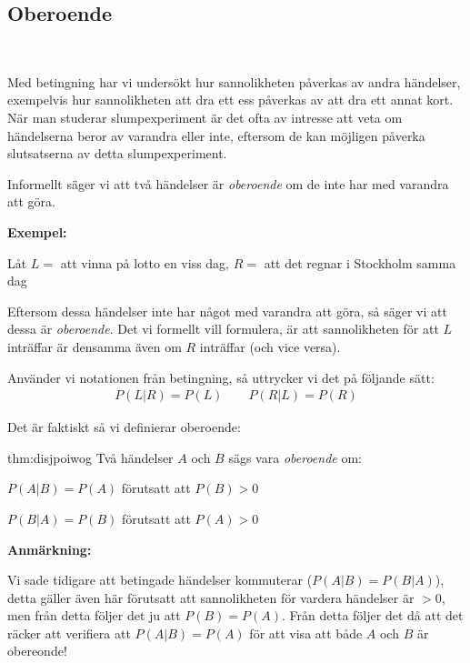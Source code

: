 \subsection{Oberoende}\hfill\\\par
\noindent Med betingning har vi undersökt hur sannolikheten påverkas av andra händelser, exempelvis hur sannolikheten att dra ett ess påverkas av att dra ett annat kort. När man studerar slumpexperiment är det ofta av intresse att veta om händelserna beror av varandra eller inte, eftersom de kan möjligen påverka slutsatserna av detta slumpexperiment.
\par\bigskip
\noindent Informellt säger vi att två händelser är \textit{oberoende} om de inte har med varandra att göra.
\par\bigskip
\noindent\textbf{Exempel:}\par
\noindent Låt $L=$ att vinna på lotto en viss dag, $R=$ att det regnar i Stockholm samma dag\par
\noindent Eftersom dessa händelser inte har något med varandra att göra, så säger vi att dessa är \textit{oberoende}. Det vi formellt vill formulera, är att sannolikheten för att $L$ inträffar är densamma även om $R$ inträffar (och vice versa).\par
\noindent Använder vi notationen från betingning, så uttrycker vi det på följande sätt:
\begin{equation*}
  \begin{gathered}
    P(L|R) = P(L)\qquad P(R|L) = P(R)
  \end{gathered}
\end{equation*}\par
\noindent Det är faktiskt så vi definierar oberoende:
\par\bigskip
\begin{theo}{thm:disjpoiwog}
  Två händelser $A$ och $B$ sägs vara \textit{oberoende} om:\par
  $P(A|B) = P(A)$ förutsatt att $P(B)>0$\par
  $P(B|A)=P(B)$ förutsatt att $P(A)>0$
\end{theo}
\par\bigskip
\noindent\textbf{Anmärkning:}\par
\noindent Vi sade tidigare att betingade händelser kommuterar ($P(A|B)=P(B|A)$), detta gäller även här förutsatt att sannolikheten för vardera händelser är $>0$, men från detta följer det ju att $P(B)=P(A)$. Från detta följer det då att det räcker att verifiera att $P(A|B)=P(A)$ för att visa att både $A$ och $B$ är obereonde!
